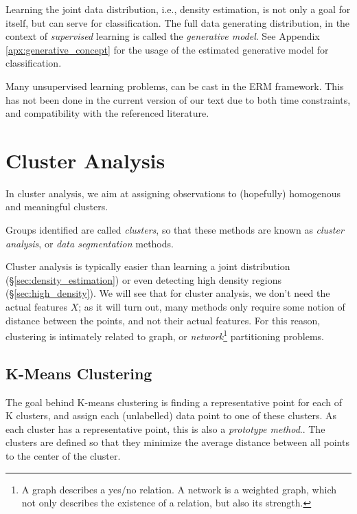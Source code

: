 \begin{remark}
Learning the joint data distribution, i.e., density estimation, is not only a goal for itself, but can serve for classification. 
The full data generating distribution, in the context of \emph{supervised} learning is called the \emph{generative model}.
See Appendix \ref{apx:generative_concept} for the usage of the estimated generative model for classification.
\end{remark}


\begin{remark}
Many unsupervised learning problems, can be cast in the ERM framework.
This has not been done in the current version of our text due to both time constraints, and compatibility with the referenced literature.
\end{remark}








\section{Cluster Analysis}
\label{sec:cluster_analysis}

In cluster analysis, we aim at assigning observations to (hopefully) homogenous and meaningful clusters. 

Groups identified are called \emph{clusters}, so that these methods are known as \emph{cluster analysis}, or \emph{data segmentation} methods.

Cluster analysis is typically easier than learning a joint distribution (\S\ref{sec:density_estimation}) or even detecting high density regions (\S\ref{sec:high_density}). 
We will see that for cluster analysis, we don't need the actual features $X$; as it will turn out, many methods only require some notion of distance between the points, and not their actual features. 
For this reason, clustering is intimately related to graph, or \emph{network}\footnote{A graph describes a yes/no relation. A network is a weighted graph, which not only describes the existence of a relation, but also its strength.} partitioning problems.



\subsection{K-Means Clustering}
\label{sec:kmeans}
The goal behind K-means clustering is finding a representative point for each of K clusters, and assign each (unlabelled) data point to one of these clusters. As each cluster has a representative point, this is also a \emph{prototype method}..
The clusters are defined so that they minimize the average distance between all points to the center of the cluster.

